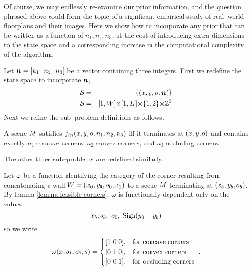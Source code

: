 Of course, we may endlessly re-examine our prior information, and the
question phrased above could form the topic of a significant empirical
study of real--world floorplans and their images. Here we show how to
incorporate any prior that can be written as a function of
$n_1,n_2,n_3$, at the cost of introducing extra dimensions to the
state space and a corresponding increase in the computational
complexity of the algorithm.

Let $\Counts=[n_1~~n_2~~n_3]$ be a vector containing three
integers. First we redefine the state space to incorporate $\Counts$,
\begin{eqnarray}
  \StateSpace &=& \{(x,y,\WallOrient,\Counts)\}\\
  \StateSpace &=& [1,\Width] \cross [1,\Height] \cross \{1,2\} \cross \Ints^3
\end{eqnarray}
Next we refine the sub--problem definitions as follows. 
\begin{definition}
  A scene $\Scene$ satisfies $\SubProbIN(x,y,\WallOrient,n_1,n_2,n_3)$
  iff it terminates at $(x,y,\WallOrient)$ and contains exactly $n_1$
  concave corners, $n_2$ convex corners, and $n_3$ occluding
  corners.
\end{definition}
The other three sub--problems are redefined similarly.

Let $\CategoryFunc$ be a function identifying the
category of the corner resulting from concatenating a wall
$\Wall=(x_0,y_0,\WallOrient_0,x_1)$ to a scene $\Scene$ terminating at
$(x_b,y_b,\WallOrient_b)$. By lemma \ref{lemma:feasible-corners},
$\CategoryFunc$ is functionally dependent only on the values
\begin{equation}
  x_b, \WallOrient_b, ~\WallOrient_0, ~\sign(y_0-y_b)
\end{equation}
so we write
\begin{equation}
  \CategoryFunc(x,\WallOrient_1,\WallOrient_2,s) =
  \begin{cases}
    [1 ~ 0 ~ 0], & \mbox{for concave corners}\\
    [0 ~ 1 ~ 0], & \mbox{for convex corners}\\
    [0 ~ 0 ~ 1], & \mbox{for occluding corners}\\
  \end{cases}~.
\end{equation}

